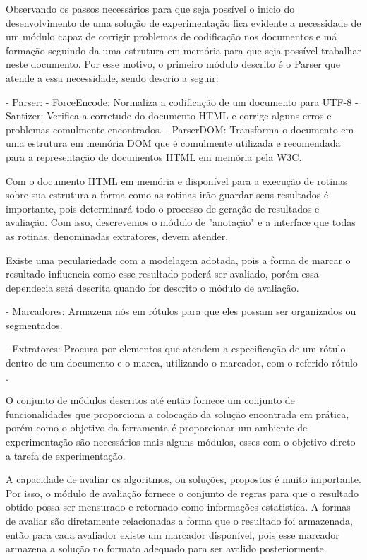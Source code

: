 \documentclass{acm_proc_article-sp}
\numberwithin{equation}{section}
\begin{document}

Observando os passos necessários para que seja possível o inicio do
desenvolvimento de uma solução de experimentação fica evidente a
necessidade de um módulo capaz de corrigir problemas de
codificação nos documentos e má formação seguindo da uma estrutura em
memória para que seja possível trabalhar neste documento. Por esse
motivo, o primeiro módulo descrito é o Parser que atende a essa
necessidade, sendo descrio a seguir:

- Parser: 
    - ForceEncode: Normaliza a codificação de um documento para UTF-8
    - Santizer: Verifica a corretude do documento HTML e corrige alguns
    erros e problemas comulmente encontrados.
    - ParserDOM: Transforma o documento em uma estrutura em memória DOM
    que é comulmente utilizada e recomendada para a representação de
    documentos HTML em memória pela W3C.

Com o documento HTML em memória e disponível para a execução de rotinas
sobre sua estrutura a forma como as rotinas irão guardar seus resultados
é importante, pois determinará todo o processo de geração de resultados
e avaliação. Com isso, descrevemos o módulo de "anotação" e a interface
que todas as rotinas, denominadas extratores, devem atender.

Existe uma peculariedade com a modelagem adotada, pois a forma de marcar
o resultado influencia como esse resultado poderá ser avaliado, porém
essa dependecia será descrita quando for descrito o módulo de avaliação.

- Marcadores: Armazena nós em rótulos para que eles possam ser
organizados ou segmentados.

- Extratores: Procura por elementos que atendem a especificação de um
rótulo dentro de um documento e o marca, utilizando o marcador, com o
referido rótulo .

O conjunto de módulos descritos até então fornece um conjunto de
funcionalidades que proporciona a colocação da solução encontrada em
prática, porém como o objetivo da ferramenta é proporcionar um ambiente
de experimentação são necessários mais alguns módulos, esses com o
objetivo direto a tarefa de experimentação.

A capacidade de avaliar os algoritmos, ou soluções, propostos é muito
importante. Por isso, o módulo de avaliação fornece o conjunto de regras
para que o resultado obtido possa ser mensurado e retornado como
informações estatistica. A formas de avaliar são diretamente
relacionadas a forma que o resultado foi armazenada, então para cada
avaliador existe um marcador disponível, pois esse marcador armazena a
solução no formato adequado para ser avalido posteriormente.
\end{document}
